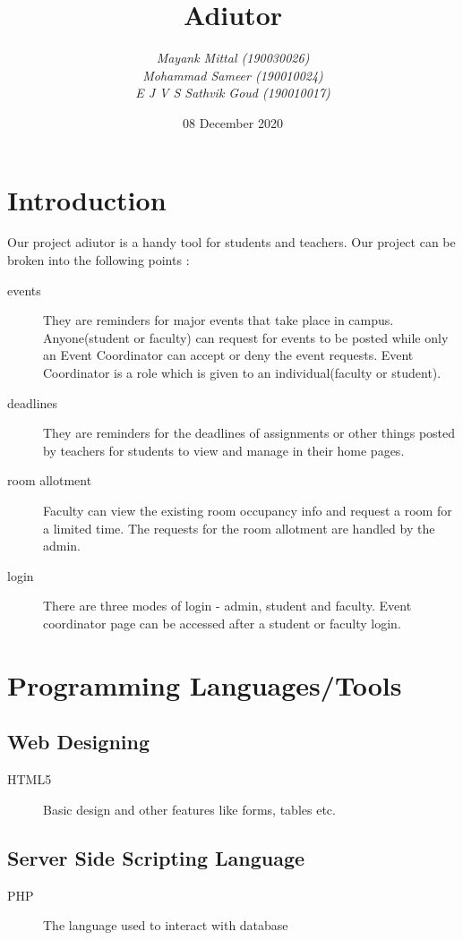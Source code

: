 \documentclass{article}
\title{\textbf{Adiutor}}
\author{\emph{Mayank Mittal (190030026)} \\ \emph{Mohammad Sameer (190010024)}\\ \emph{E J V S Sathvik Goud (190010017)}}
\date{08 December 2020}
\begin{document}
\maketitle

\section{Introduction}
Our project adiutor is a handy tool for students and teachers. Our project can be broken into the following points : 
\begin{description}
    \item[events] They are reminders for major events that take place in campus. Anyone(student or faculty) can request for events to be posted while only an Event Coordinator can accept or deny the event requests. Event Coordinator is a role which is given to an individual(faculty or student).
    \item [deadlines] They are reminders for the deadlines of assignments or other things posted by teachers for students to view and manage in their home pages.
    \item [room allotment] Faculty can view the existing room occupancy info  and request a room for a limited time. The requests for the room allotment are handled by the admin.
    \item [login] There are three modes of login - admin, student and faculty. Event coordinator page can be accessed after a student or faculty login.
\end{description}

\section{Programming Languages/Tools}
\subsection{Web Designing}
\begin{description}
    \item[HTML5] Basic design and other features like forms, tables etc.
\end{description}

\subsection{Server Side Scripting Language}
\begin{description}
    \item[PHP] The language used to interact with database
\end{description}
\end{document}
